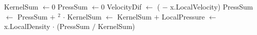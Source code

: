 \begin{algorithm}
\begin{algorithmic}[1]
    \State KernelSum $\gets 0$
    \State PressSum $\gets 0$
        \State VelocityDif $\gets$ ( $-$ x.LocalVelocity)
        \State PressSum $\gets$ PressSum $+$ $^2$ $\cdot$ 
        \State KernelSum $\gets$ KernelSum $+$ 
    \EndFor
    \State LocalPressure $\gets$ x.LocalDensity $\cdot$ (PressSum $/$ KernelSum)
\EndFor
\EndFunction


\end{algorithmic}

\end{algorithm}